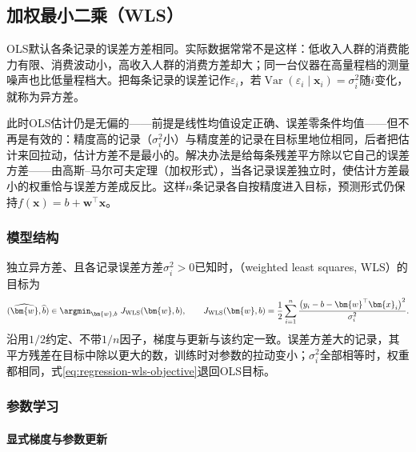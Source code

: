 \subsection{加权最小二乘（WLS）}
\label{sec:regression-wls}

OLS默认各条记录的误差方差相同。实际数据常常不是这样：低收入人群的消费能力有限、消费波动小，高收入人群的消费方差却大；同一台仪器在高量程档的测量噪声也比低量程档大。把每条记录的误差记作$\varepsilon_i$，若$\operatorname{Var}(\varepsilon_i\mid\bm{x}_i)=\sigma_i^2$随$i$变化，就称为异方差。

此时OLS估计仍是无偏的——前提是线性均值设定正确、误差零条件均值——但不再是有效的：精度高的记录（$\sigma_i^2$小）与精度差的记录在目标里地位相同，后者把估计来回拉动，估计方差不是最小的。解决办法是给每条残差平方除以它自己的误差方差——由高斯--马尔可夫定理（加权形式），当各记录误差独立时，使估计方差最小的权重恰与误差方差成反比。这样$n$条记录各自按精度进入目标，预测形式仍保持$f(\bm{x})=b+\bm{w}^{\top}\bm{x}$。

\subsubsection{模型结构}
\label{sec:regression-wls-structure}

独立异方差、且各记录误差方差$\sigma_i^2>0$已知时，（weighted least squares, WLS）的目标为
\begin{equation}
  (\widehat{\bm{w}},\widehat b)
  \in\argmin_{\bm{w},b}\ J_{\mathrm{WLS}}(\bm{w},b),
  \qquad
  J_{\mathrm{WLS}}(\bm{w},b)=\frac12\sum_{i=1}^{n}\frac{\bigl(y_i-b-\bm{w}^{\top}\bm{x}_i\bigr)^2}{\sigma_i^2}.
  \label{eq:regression-wls-objective}
\end{equation}
沿用$1/2$约定、不带$1/n$因子，梯度与更新与该约定一致。误差方差大的记录，其平方残差在目标中除以更大的数，训练时对参数的拉动变小；$\sigma_i^2$全部相等时，权重都相同，式\eqref{eq:regression-wls-objective}退回OLS目标。

\subsubsection{参数学习}
\label{sec:regression-wls-learning}

\paragraph{显式梯度与参数更新}


